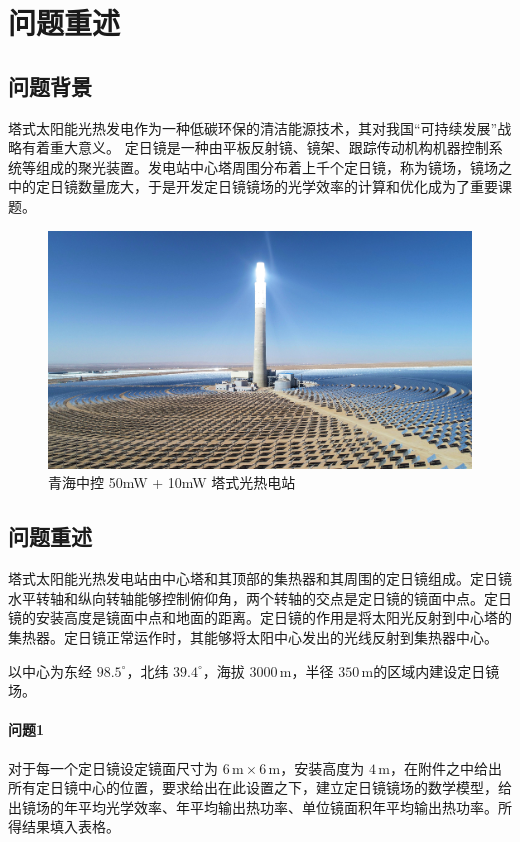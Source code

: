 \section{问题重述}
\subsection{问题背景}
塔式太阳能光热发电作为一种低碳环保的清洁能源技术，其对我国``可持续发展''战略有着重大意义。
定日镜是一种由平板反射镜、镜架、跟踪传动机构机器控制系统等组成的聚光装置。发电站中心塔周围分布着上千个定日镜，称为镜场，镜场之中的定日镜数量庞大，于是开发定日镜镜场的光学效率的计算和优化成为了重要课题。

\begin{figure}[H]
\centering
\includegraphics[scale = 0.07]{tower.jpg}
\caption{\kaishu 青海中控 {\rm 50mW + 10mW} 塔式光热电站 \cite{web}}
\end{figure}
\subsection{问题重述}
塔式太阳能光热发电站由中心塔和其顶部的集热器和其周围的定日镜组成。定日镜水平转轴和纵向转轴能够控制俯仰角，两个转轴的交点是定日镜的镜面中点。定日镜的安装高度是镜面中点和地面的距离。定日镜的作用是将太阳光反射到中心塔的集热器。定日镜正常运作时，其能够将太阳中心发出的光线反射到集热器中心。

以中心为东经 \(98.5^\circ\)，北纬 \(39.4 ^\circ\)，海拔 \(3000\, \mathrm{m}\)，半径 \(350 \, \mathrm{m}\)的区域内建设定日镜场。
\paragraph{问题1}
对于每一个定日镜设定镜面尺寸为 \(6 \,\mathrm{m} \times 6 \, \mathrm{m}\)，安装高度为 \(4 \,\mathrm{m}\)，在附件之中给出所有定日镜中心的位置，要求给出在此设置之下，建立定日镜镜场的数学模型，给出镜场的年平均光学效率、年平均输出热功率、单位镜面积年平均输出热功率。所得结果填入表格。
